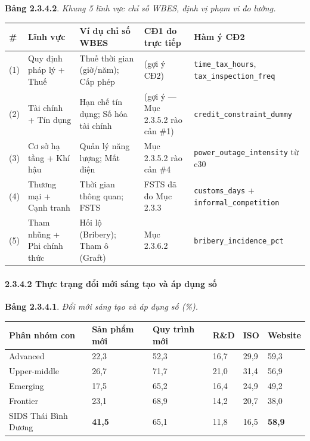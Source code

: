 \documentclass[12pt,a4paper]{article}
\begin{document}
\textbf{Bảng 2.3.4.2}. \emph{Khung 5 lĩnh vực chỉ số WBES, định vị phạm
vi đo lường.}

\begin{longtable}[]{@{}lllll@{}}
\toprule\noalign{}
\# & Lĩnh vực & Ví dụ chỉ số WBES & CĐ1 đo trực tiếp & Hàm ý CĐ2 \\
\midrule\noalign{}
\endhead
\bottomrule\noalign{}
\endlastfoot
(1) & Quy định pháp lý + Thuế & Thuế thời gian (giờ/năm); Cấp phép &
(gợi ý CĐ2) & \texttt{time\_tax\_hours},
\texttt{tax\_inspection\_freq} \\
(2) & Tài chính + Tín dụng & Hạn chế tín dụng; Số hóa tài chính & (gợi ý
--- Mục 2.3.5.2 rào cản \#1) & \texttt{credit\_constraint\_dummy} \\
(3) & Cơ sở hạ tầng + Khí hậu & Quản lý năng lượng; Mất điện & Mục
2.3.5.2 rào cản \#4 & \texttt{power\_outage\_intensity} từ c30 \\
(4) & Thương mại + Cạnh tranh & Thời gian thông quan; FSTS & FSTS đã đo
Mục 2.3.3 & \texttt{customs\_days} + \texttt{informal\_competition} \\
(5) & Tham nhũng + Phi chính thức & Hối lộ (Bribery); Tham ô (Graft) &
Mục 2.3.6.2 & \texttt{bribery\_incidence\_pct} \\
\end{longtable}

\hypertarget{2342-thux1ef1c-trux1ea1ng-ux111ux1ed5i-mux1edbi-suxe1ng-tux1ea1o-vuxe0-uxe1p-dux1ee5ng-sux1ed1}{%
\paragraph{2.3.4.2 Thực trạng đổi mới sáng tạo và áp dụng
số}\label{2342-thux1ef1c-trux1ea1ng-ux111ux1ed5i-mux1edbi-suxe1ng-tux1ea1o-vuxe0-uxe1p-dux1ee5ng-sux1ed1}}

\textbf{Bảng 2.3.4.1}. \emph{Đổi mới sáng tạo và áp dụng số (\%).}

\begin{longtable}[]{@{}llllll@{}}
\toprule\noalign{}
Phân nhóm con & Sản phẩm mới & Quy trình mới & R\&D & ISO & Website \\
\midrule\noalign{}
\endhead
\bottomrule\noalign{}
\endlastfoot
Advanced & 22,3 & 52,3 & 16,7 & 29,9 & 59,3 \\
Upper-middle & 26,7 & 71,7 & 21,0 & 31,4 & 56,9 \\
Emerging & 17,5 & 65,2 & 16,4 & 24,9 & 49,2 \\
Frontier & 23,1 & 68,9 & 14,2 & 20,7 & 38,0 \\
SIDS Thái Bình Dương & \textbf{41,5} & 65,1 & 11,8 & 16,5 &
\textbf{58,9} \\
\end{longtable}
\end{document}
